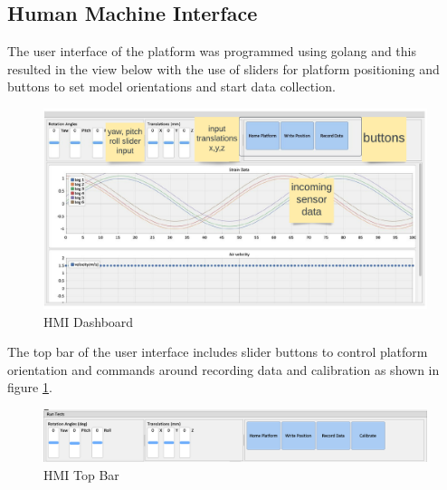 \subsection{Human Machine Interface}
The user interface of the platform was programmed using golang and this resulted in the view below with the use of sliders for platform positioning and buttons to set model orientations and start data collection.
\begin{center}
	\begin{figure}[H]
		\centering
		\includegraphics[width=1\linewidth]{Figures/hmi}
		\caption[HMI Dashboard]{HMI Dashboard}
	\end{figure}
\end{center}

The top bar of the user interface includes slider buttons to control platform orientation and commands around recording data and calibration as shown in figure \ref{fig:hmi_top}.
\begin{center}
	\begin{figure}[H]
		\centering
		\includegraphics[width=1\linewidth]{Figures/Screenshot 2022-12-11 195125.png}
		\caption[HMI Top Bar]{HMI Top Bar}
		\label{fig:hmi_top}
	\end{figure}
\end{center}

